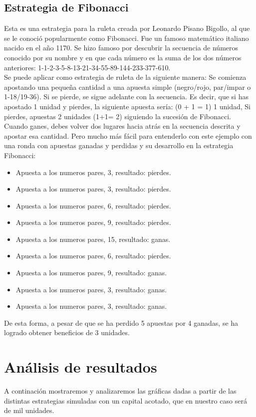 \documentclass{article}
\begin{document}
\subsection{Estrategia de Fibonacci}
Esta es una estrategia para la ruleta creada por Leonardo Pisano Bigollo, al que se le conoció popularmente como Fibonacci. Fue un famoso matemático italiano nacido en el año 1170. Se hizo famoso por descubrir la secuencia de números conocido por su nombre y en que cada número es la suma de los dos números anteriores: 1-1-2-3-5-8-13-21-34-55-89-144-233-377-610.\\

Se puede aplicar como estrategia de ruleta de la siguiente manera: Se comienza apostando una pequeña cantidad a una apuesta simple (negro/rojo, par/impar o 1-18/19-36). Si se pierde, se sigue adelante con la secuencia. Es decir, que si has apostado 1 unidad y pierdes, la siguiente apuesta sería: (0 + 1 = 1) 1 unidad, Si pierdes, apuestas 2 unidades (1+1= 2) siguiendo la sucesión de Fibonacci. Cuando ganes, debes volver dos lugares hacia atrás en la secuencia descrita y apostar esa cantidad. Pero mucho más fácil para entenderlo con este ejemplo con una ronda con apuestas ganadas y perdidas y su desarrollo en la estrategia Fibonacci:
\begin{itemize}
\item Apuesta a los numeros pares, 3, resultado: pierdes.
\item Apuesta a los numeros pares, 3, resultado: pierdes.
\item Apuesta a los numeros pares, 6, resultado: pierdes.
\item Apuesta a los numeros pares, 9, resultado: pierdes.
\item Apuesta a los numeros pares, 15, resultado: ganas.
\item Apuesta a los numeros pares, 6, resultado: pierdes.
\item Apuesta a los numeros pares, 9, resultado: ganas.
\item Apuesta a los numeros pares, 3, resultado: ganas.
\item Apuesta a los numeros pares, 3, resultado: ganas.
\end{itemize}

De esta forma, a pesar de que se ha perdido 5 apuestas por 4 ganadas, se ha logrado obtener beneficios de 3 unidades.

\section{Análisis de resultados}
A continación mostraremos y analizaremos las gráficas dadas a partir de las distintas estrategias simuladas con un capital acotado, que en nuestro caso será de mil unidades.
\end{document}
